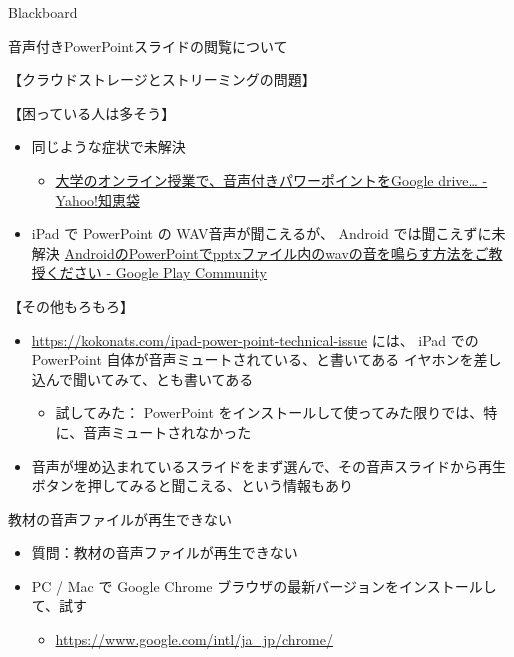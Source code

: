 \documentclass[a4j,10pt]{jsarticle}
\begin{document}
{\begin{frame}[label={sec:org166405d},fragile]{Blackboard}
\begin{block}{音声付きPowerPointスライドの閲覧について}
\begin{block}{【クラウドストレージとストリーミングの問題】}
\begin{itemize}
\end{itemize}
\end{block}
\par
\begin{block}{【困っている人は多そう】}
\begin{itemize}
\item 同じような症状で未解決
\begin{itemize}
\item \href{https://detail.chiebukuro.yahoo.co.jp/qa/question\_detail/q12224034462}{大学のオンライン授業で、音声付きパワーポイントをGoogle drive\ldots{} - Yahoo!知恵袋}
\end{itemize}
\item iPad で PowerPoint の WAV音声が聞こえるが、 Android では聞こえずに未解決
\href{https://support.google.com/googleplay/thread/24892579?hl=ja}{AndroidのPowerPointでpptxファイル内のwavの音を鳴らす方法をご教授ください - Google Play Community}
\end{itemize}
\end{block}
\par
\begin{block}{【その他もろもろ】}
\begin{itemize}
\item \url{https://kokonats.com/ipad-power-point-technical-issue} には、 iPad での PowerPoint 自体が音声ミュートされている、と書いてある
イヤホンを差し込んで聞いてみて、とも書いてある
\begin{itemize}
\item 試してみた：  PowerPoint をインストールして使ってみた限りでは、特に、音声ミュートされなかった
\end{itemize}
\item 音声が埋め込まれているスライドをまず選んで、その音声スライドから再生ボタンを押してみると聞こえる、という情報もあり
\end{itemize}
\end{block}
\end{block}
\par
\begin{block}{教材の音声ファイルが再生できない}
\begin{itemize}
\item 質問：教材の音声ファイルが再生できない
\par
\item PC / Mac で Google Chrome ブラウザの最新バージョンをインストールして、試す
\begin{itemize}
\item \url{https://www.google.com/intl/ja\_jp/chrome/}

\end{itemize}
\end{itemize}
\end{block}
\end{frame}}
\end{document}
